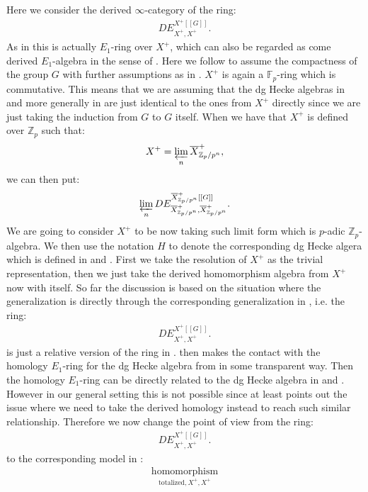 \documentclass[12pt]{article}
\theoremstyle{definition}
\begin{document}
\noindent Here we consider the derived $\infty$-category of the ring:
\begin{align}
DE^{X^+[[G]]}_{X^+,X^+}.
\end{align}
As in \cite{So1} this is actually $E_1$-ring over $X^+$, which can also be regarded as come derived $E_1$-algebra in the sense of \cite{Sa}. Here we follow \cite{So1} to assume the compactness of the group $G$ with further assumptions as in \cite{So1}. $X^+$ is again a $\mathbb{F}_p$-ring which is commutative. This means that we are assuming that the dg Hecke algebras in \cite{Sc1} and more generally in \cite{HM} are just identical to the ones from $X^+$ directly since we are just taking the induction from $G$ to $G$ itself. When we have that $X^+$ is defined over $\mathbb{Z}_p$ such that:
\begin{align}
X^+ = \varprojlim_{n} \overline{X}^+_{\mathbb{Z}_p/p^n},
\end{align}
we can then put:
\begin{align}
\varprojlim_n DE^{\overline{X}^+_{\mathbb{Z}_p/p^n}[[G]]}_{\overline{X}^+_{\mathbb{Z}_p/p^n},\overline{X}^+_{\mathbb{Z}_p/p^n}}.
\end{align}
We are going to consider $X^+$ to be now taking such limit form which is $p$-adic $\mathbb{Z}_p$-algebra. We then use the notation $H$ to denote the corresponding dg Hecke algera which is defined in \cite{Sc1} and \cite{HM}. First we take the resolution of $X^+$ as the trivial representation, then we just take the derived homomorphism algebra from $X^+$ now with itself. So far the discussion is based on the situation where the generalization is directly through the corresponding generalization in \cite{So1}, i.e. the ring:
\begin{align}
DE^{X^+[[G]]}_{X^+,X^+}.
\end{align}
is just a relative version of the ring in \cite{So1}. \cite{So1} then makes the contact with the homology $E_1$-ring for the dg Hecke algebra from \cite{Sc1} in some transparent way. Then the homology $E_1$-ring can be directly related to the dg Hecke algebra in \cite{Sc1} and \cite{HM}. However in our general setting this is not possible since at least \cite{Sa} points out the issue where we need to take the derived homology instead to reach such similar relationship. Therefore we now change the point of view from the ring:
\begin{align}
DE^{X^+[[G]]}_{X^+,X^+}.
\end{align}
to the corresponding model in \cite{Sa}:
\begin{align}
\underset{{\mathrm{totalized},X^+,X^+}}{\mathrm{homomorphism}}
\end{align}
\end{document}
